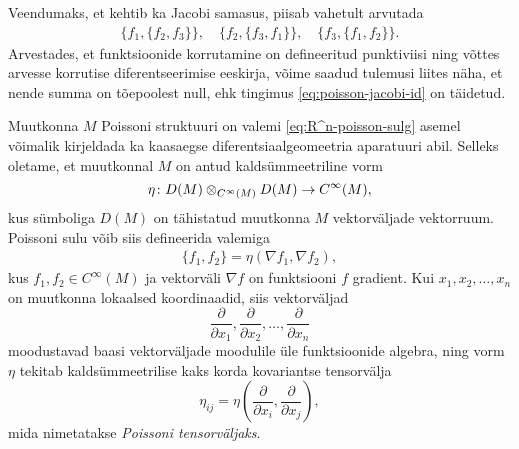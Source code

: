 Veendumaks, et kehtib ka Jacobi samasus, piisab vahetult arvutada
\begin{align*}
    \{f_1, \{f_2, f_3\}\}, \quad
    \{f_2, \{f_3, f_1\}\}, \quad
    \{f_3, \{f_1, f_2\}\}.
\end{align*}
Arvestades, et funktsioonide korrutamine on defineeritud punktiviisi ning
võttes arvesse korrutise diferentseerimise eeskirja, võime saadud tulemusi
liites näha, et nende summa on tõepoolest null, ehk tingimus
\eqref{eq:poisson-jacobi-id} on täidetud.

Muutkonna $M$ Poissoni struktuuri on valemi \eqref{eq:R^n-poisson-sulg}
asemel võimalik kirjeldada ka kaasaegse diferentsiaalgeomeetria
aparatuuri abil. Selleks oletame, et muutkonnal $M$ on antud
kaldsümmeetriline vorm
\[ \eta \colon D(M) \otimes_{C^\infty(M)} D(M) \to C^\infty(M), \]
kus sümboliga $D(M)$ on tähistatud muutkonna $M$ vektorväljade vektorruum.
Poissoni sulu võib siis defineerida valemiga
\begin{align}\label{eq:poisson-brac-nabla}
    \{ f_1, f_2 \} = \eta(\nabla f_1, \nabla f_2),
\end{align}
kus $f_1, f_2 \in C^\infty(M)$ ja vektorväli $\nabla f$ on
funktsiooni $f$ gradient. Kui $x_1, x_2, \dots, x_n$ on muutkonna
lokaalsed koordinaadid, siis vektorväljad
\[
    \frac{\partial}{\partial x_1},
    \frac{\partial}{\partial x_2},
    \dots,
    \frac{\partial}{\partial x_n}
\]
moodustavad baasi vektorväljade moodulile üle funktsioonide algebra,
ning vorm $\eta$ tekitab kaldsümmeetrilise kaks korda kovariantse
tensorvälja
\[
    \eta_{ij} = \eta\left(
        \frac{\partial}{\partial x_i}, \frac{\partial}{\partial x_j}
    \right),
\]
mida nimetatakse \emph{Poissoni tensorväljaks}.


